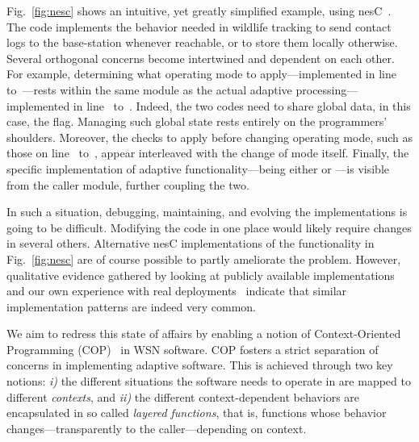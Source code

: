 
Fig.~\ref{fig:nesc} shows an intuitive, yet greatly simplified
example, using nesC~\cite{}. The code implements the behavior needed
in wildlife tracking to send contact logs to the base-station whenever
reachable, or to store them locally otherwise. Several orthogonal
concerns become intertwined and dependent on each other. For example,
determining what operating mode to apply---implemented in
line~ to~---rests within the same
module as the actual adaptive processing---implemented in
line~ to~. Indeed, the two codes need to
share global data, in this case, the 
flag. Managing such global state rests entirely on the programmers'
shoulders. Moreover, the checks to apply before changing operating
mode, such as those on line~ to~, appear
interleaved with the change of mode itself. Finally, the specific
implementation of adaptive functionality---being either
 or ---is visible from the caller
module, further coupling the two.

In such a situation, debugging, maintaining, and evolving the
implementations is going to be difficult. Modifying the code in one
place would likely require changes in several others. Alternative nesC
implementations of the functionality in Fig.~\ref{fig:nesc} are of
course possible to partly ameliorate the problem. However, qualitative
evidence gathered by looking at publicly available
implementations~\cite{tinyos} and our own experience with real
deployments~\cite{torre,tunnel, squirrel} indicate that similar
implementation patterns are indeed very common.


 We aim to redress this state of
affairs by enabling a notion of Context-Oriented Programming
(COP)~\cite{} in WSN software. COP fosters a strict separation of
concerns in implementing adaptive software. This is achieved through
two key notions: \emph{i)} the different situations the software needs
to operate in are mapped to different \emph{contexts}, and \emph{ii)}
the different context-dependent behaviors are encapsulated in so
called \emph{layered functions}, that is, functions whose behavior
changes---transparently to the caller---depending on context.

